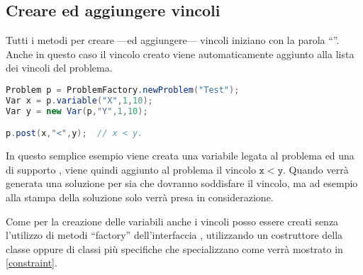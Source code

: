 \subsection{Creare ed aggiungere vincoli}
Tutti i metodi per creare ---ed aggiungere--- vincoli iniziano con la parola 
``''. Anche in questo caso il vincolo creato viene automaticamente
aggiunto alla lista dei vincoli del problema. 
\begin{lstlisting}[language = Java]
Problem p = ProblemFactory.newProblem("Test");
Var x = p.variable("X",1,10);
Var y = new Var(p,"Y",1,10);

p.post(x,"<",y);  // x < y.
\end{lstlisting}
In questo semplice esempio viene creata una variabile legata al problema 
 ed una di supporto , viene quindi aggiunto al problema
il vincolo $\mathtt{x} < \mathtt{y}$. Quando verrà generata una soluzione
per  sia  che  dovranno soddisfare il vincolo, ma
ad esempio alla stampa della soluzione solo  verrà presa in 
considerazione.

Come per la creazione delle variabili anche i vincoli posso essere creati
senza l'utilizzo di metodi ``factory'' dell'interfaccia ,
utilizzando un costruttore della classe  oppure
di classi più specifiche che specializzano  come
verrà mostrato in \ref{constraint}.

